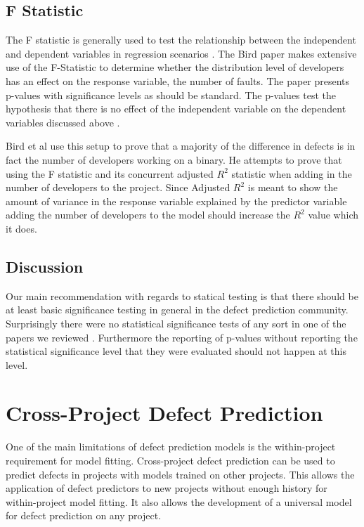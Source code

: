 \documentclass{sig-alternate-05-2015}
\begin{document}
\subsection{F Statistic}
The F statistic is generally used to test the relationship between the independent and dependent variables in regression scenarios \cite{James}.  The Bird paper makes extensive use of the F-Statistic to determine whether the distribution level of developers has an effect on the response variable, the number of faults.  The paper presents p-values with significance levels as should be standard.  The p-values test the hypothesis that there is no effect of the independent variable on the dependent variables discussed above \cite{Bird}.  

Bird et al use this setup to prove that a majority of the difference in defects is in fact the number of developers working on a binary.  He attempts to prove that using the F statistic and its concurrent adjusted $R^{2}$ statistic when adding in the number of developers to the project. Since Adjusted $R^{2}$ is meant to show the amount of variance in the response variable explained by the predictor variable adding the number of developers to the model should increase the $R^{2}$ value which it does.

\subsection{Discussion}
Our main recommendation with regards to statical testing is that there should be at least basic significance testing in general in the defect prediction community.  Surprisingly there were no statistical significance tests of any sort in one of the papers we reviewed \cite{Vandecruys}. Furthermore the reporting of p-values without reporting the statistical significance level that they were evaluated should not happen at this level.

\section{Cross-Project Defect Prediction}
One of the main limitations of defect prediction models is the within-project requirement for model fitting. Cross-project defect prediction can be used to predict defects in projects with models trained on other projects. This allows the application of defect predictors to new projects without enough history for within-project model fitting. It also allows the development of a universal model for defect prediction on any project.
\end{document}
